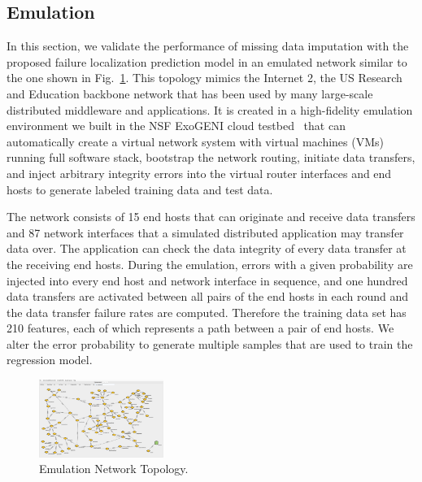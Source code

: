 \subsection{Emulation}
In this section, we validate the performance of missing data imputation with the proposed failure localization prediction 
model in an emulated network similar to the one shown in Fig.~\ref{fig:topology}. This topology mimics the Internet 2, the US Research 
and Education backbone network that has been used by many large-scale distributed middleware and applications.
It is created in a high-fidelity emulation environment we built in the NSF ExoGENI cloud testbed~\cite{iris:ictc21} 
that can automatically create a virtual network system with virtual machines (VMs) running full software stack, 
bootstrap the network routing, initiate data transfers, and inject arbitrary integrity errors into the virtual router interfaces 
and end hosts to generate labeled training data and test data.

The network consists of 15 end hosts that can originate and receive data transfers and 87 network interfaces that a simulated 
distributed application may transfer data over. The application can check the data integrity of every data transfer at the receiving end hosts.
During the emulation, errors with a given probability are injected into every end host and network interface in sequence, and one hundred 
data transfers are activated between all pairs of the end hosts in each round and the data transfer failure rates are computed. 
Therefore the training data set has 210 features, each of which represents a path between a pair of end hosts. We alter the error probability to generate 
multiple samples that are used to train the regression model.

\begin{figure}[!ht]
\begin{center}
\includegraphics[width=0.36\textwidth]{./figure/osg_pegasus_request.png}
\end{center}
\caption{Emulation Network Topology.}
\label{fig:topology}
\end{figure}


